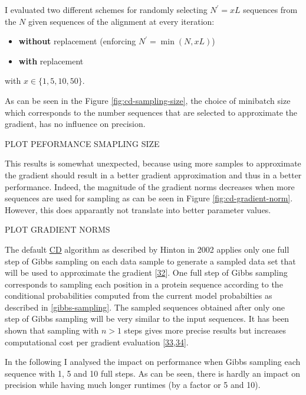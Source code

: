 \documentclass[12pt,a4paper,twoside]{book}
\providecommand{\tightlist}{%
  \setlength{\itemsep}{0pt}\setlength{\parskip}{0pt}}
\newcommand{\eq}{\!=\!}
\theoremstyle{definition}
\theoremstyle{definition}
\theoremstyle{remark}
\begin{document}
I evaluated two different schemes for randomly selecting
\(N^{\prime} \eq xL\) sequences from the \(N\) given sequences of the
alignment at every iteration:

\begin{itemize}
\tightlist
\item
  \textbf{without} replacement (enforcing
  \(N^{\prime} \eq \min(N, xL)\))
\item
  \textbf{with} replacement
\end{itemize}

with \(x \in \{ 1, 5, 10, 50 \}\).

As can be seen in the Figure \ref{fig:cd-sampling-size}, the choice of
minibatch size which corresponds to the number sequences that are
selected to approximate the gradient, has no influence on precision.

PLOT PEFORMANCE SMAPLING SIZE

This results is somewhat unexpected, because using more samples to
approximate the gradient should result in a better gradient
approximation and thus in a better performance. Indeed, the magnitude of
the gradient norms decreases when more sequences are used for sampling
as can be seen in Figure \ref{fig:cd-gradient-norm}. However, this does
apparantly not translate into better parameter values.

PLOT GRADIENT NORMS

The default \protect\hyperlink{abbrev}{CD} algorithm as described by
Hinton in 2002 applies only one full step of Gibbs sampling on each data
sample to generate a sampled data set that will be used to approximate
the gradient {[}\protect\hyperlink{ref-Hinton2002}{32}{]}. One full step
of Gibbs sampling corresponds to sampling each position in a protein
sequence according to the conditional probabilities computed from the
current model probabilties as described in \ref{gibbs-sampling}. The
sampled sequences obtained after only one step of Gibbs sampling will be
very similar to the input sequences. It has been shown that sampling
with \(n>1\) steps gives more precise results but increases
computational cost per gradient evaluation
{[}\protect\hyperlink{ref-Bengio2009}{33},\protect\hyperlink{ref-Tieleman2008}{34}{]}.

In the following I analysed the impact on performance when Gibbs
sampling each sequence with 1, 5 and 10 full steps. As can be seen,
there is hardly an impact on precision while having much longer runtimes
(by a factor or 5 and 10).
\end{document}
